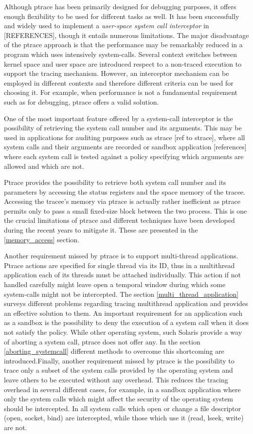 Although ptrace has been primarily designed for debugging purposes, it offers enough flexibility to be used for different tasks as well. It has been successfully and widely used to implement a \emph{user-space system call interceptor} in [REFERENCES], though it entails numerous limitations. The major disadvantage of the ptrace approach is that the performance may be remarkably reduced in a program which uses intensively system-calls. Several context switches between kernel space and user space are introduced respect to a non-traced execution to support the tracing mechanism. However, an interceptor mechanism can be employed in different contexts and therefore different criteria can be used for choosing it. For example, when performance is not a fundamental requirement such as for debugging, ptrace offers a valid solution. 

One of the most important feature offered by a system-call interceptor is the possibility of retrieving the system call number and its arguments. This may be used in applications for auditing purposes such as strace [ref to strace], where all system calls and their arguments are recorded or sandbox application [references] where each system call is tested against a policy specifying which arguments are allowed and which are not.

Ptrace provides the possibility to retrieve both system call number and its parameters by accessing the status registers and the space memory of the tracee. Accessing the tracee's memory via ptrace is actually rather inefficient as ptrace permits only to pass a small fixed-size block  between the two process. This is one the crucial limitations of ptrace and different techniques have been developed during the recent years to mitigate it. These are presented in the \ref{memory_access} section. 


Another requirement missed by ptrace is to support multi-thread applications. Ptrace actions are specified for single thread via its ID, thus in a multithread application each of its threads must be attached individually. This action if not handled carefully might leave open a temporal window during which some system-calls might not be intercepted. The section  \ref{multi_thread_application} surveys different problems regarding tracing multithread application and provides an effective solution to them.
An important requirement for an application such as a sandbox is the possibility to deny the execution of a system call when it does not satisfy the policy. While other operating system, such Solaris provide a way of aborting a system call, ptrace does not offer any.  In the section \ref{aborting_systemcall} different methods to overcome this shortcoming are introduced.Finally, another requirement missed by ptrace is the possibility to trace only a subset of the system calls provided by the operating system and leave others to be executed without any overhead. This reduces the tracing overhead in several different cases, for example, in a sandbox application  where only the system calls which might affect the security of the operating system should be intercepted. In \cite{Noordende_asecure} all system calls which open or change a file descriptor (open, socket, bind) are intercepted, while those which use it (read, lseek, write) are not. 



